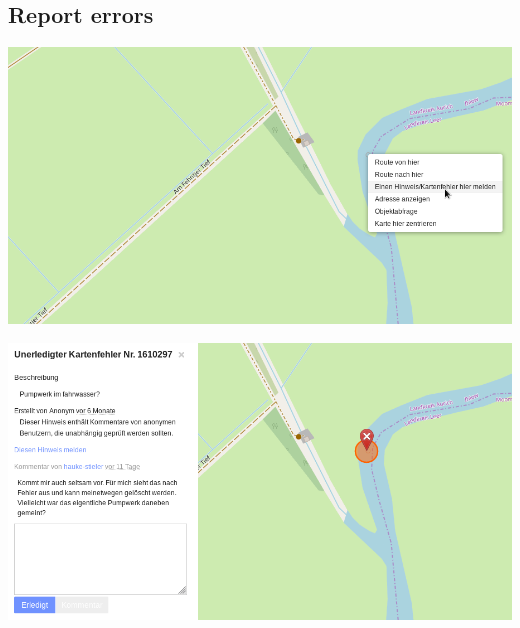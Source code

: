 \documentclass{beamer}
\begin{document}
	\subsection{Report errors}
	
	\begin{frame}
		\begin{center}
			\includegraphics[width=\linewidth,height=\textheight,keepaspectratio]{images/report-error-menu}
		\end{center}
	\end{frame}
	
	\begin{frame}
		\begin{center}
			\includegraphics[width=\linewidth,height=\textheight,keepaspectratio]{images/report-error}
		\end{center}
	\end{frame}
\end{document}
